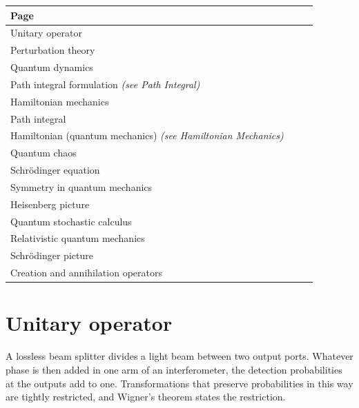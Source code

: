 \documentclass[11pt,oneside]{book}
\begin{document}
\begin{longtable}{p{0.92\linewidth}}
\toprule
Page \\
\midrule
\endhead
{}\label{page:unitary-operator}Unitary operator \\
\label{page:perturbation-theory}Perturbation theory \\
\label{page:quantum-dynamics}Quantum dynamics \\
\label{page:path-integral-formulation}Path integral formulation \emph{(see Path Integral)} \\
\label{page:hamiltonian-mechanics}Hamiltonian mechanics \\
\label{page:path-integral}Path integral \\
\label{page:hamiltonian-quantum-mechanics}Hamiltonian (quantum mechanics) \emph{(see Hamiltonian Mechanics)} \\
\label{page:quantum-chaos}Quantum chaos \\
\label{page:schr-dinger-equation}Schrödinger equation \\
\label{page:symmetry-in-quantum-mechanics}Symmetry in quantum mechanics \\
\label{page:heisenberg-picture}Heisenberg picture \\
\label{page:quantum-stochastic-calculus}Quantum stochastic calculus \\
\label{page:relativistic-quantum-mechanics}Relativistic quantum mechanics \\
\label{page:schr-dinger-picture}Schrödinger picture \\
\label{page:creation-and-annihilation-operators}Creation and annihilation operators \\
\bottomrule
\end{longtable}

\clearpage

\section{Unitary operator}

\label{topic:unitary-operator}

A lossless beam splitter divides a light beam between two output ports. Whatever phase is then added in one arm of an interferometer, the detection probabilities at the outputs add to one. Transformations that preserve probabilities in this way are tightly restricted, and Wigner's theorem states the restriction.
\end{document}
